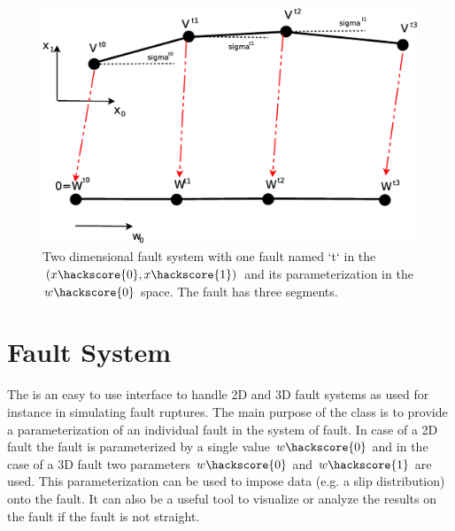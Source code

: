 \begin{figure}
\includegraphics[width=\textwidth]{figures/FaultSystem2D}
\caption{\label{FAULTSYSTEM2D}Two dimensional fault system with one fault named `t` in the $(x\hackscore{0},x\hackscore{1})$ and its parameterization in the
$w\hackscore{0}$ space. The fault has three segments.}
\end{figure}

\section{Fault System}
\label{Fault System}
The  is an easy to use interface to handle 2D and 3D fault systems  as used for instance in simulating fault ruptures. The main purpose of the class is to provide a parameterization of an individual fault in the system of fault. In case of a 2D fault the fault is parameterized by a single value $w\hackscore{0}$ and in the case of a 3D fault two parameters $w\hackscore{0}$ and $w\hackscore{1}$ are used. This parameterization can be used
to impose data (e.g. a slip distribution) onto the fault. It can also be a useful tool to visualize or analyze the results on the fault if the fault is not straight. 

